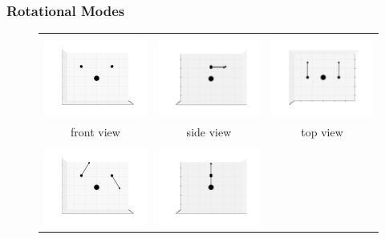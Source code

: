 \documentclass[11pt]{article}
\begin{document}
\subsubsection{Rotational Modes}
\label{rot}
\begin{figure}[htp]
	\centering
	\begin{tabular}{|ccc|}\hline&&\\
	\includegraphics[width=5.5cm,clip=true,trim=3cm 2cm 3cm 2cm]{0-0_3.pdf}&
	\includegraphics[width=5.5cm,clip=true,trim=3cm 2cm 3cm 2cm]{0-90_3.pdf}&
	\includegraphics[width=5.5cm,clip=true,trim=3cm 2cm 3cm 2cm]{90-0_3.pdf}\\front view&side view&top view\\\hline&&\\
	\includegraphics[width=5.5cm,clip=true,trim=3cm 2cm 3cm 2cm]{0-0_4.pdf}&
	\includegraphics[width=5.5cm,clip=true,trim=3cm 2cm 3cm 2cm]{0-90_4.pdf}&

\end{tabular}
\end{figure}
\end{document}
